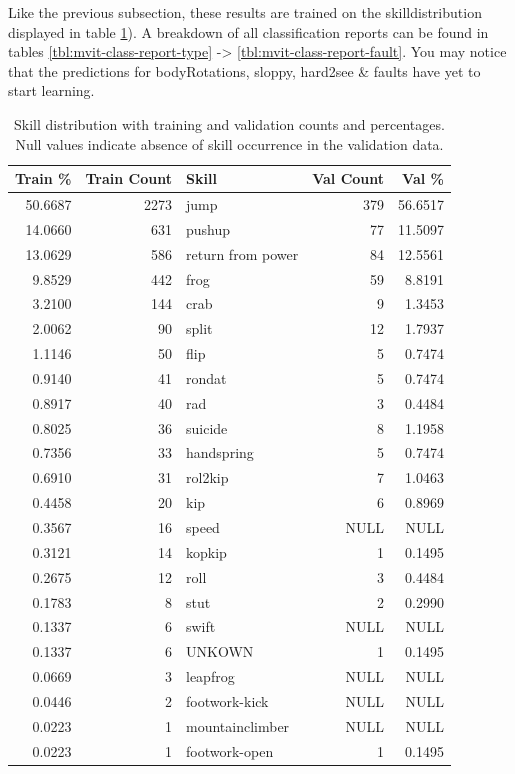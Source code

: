 Like the previous subsection, these results are trained on the skilldistribution displayed in table \ref{tab:skill_distribution_full_with_nulls}).
A breakdown of all classification reports can be found in tables \ref{tbl:mvit-class-report-type} -> \ref{tbl:mvit-class-report-fault}. You may notice that the predictions for bodyRotations, sloppy, hard2see \& faults have yet to start learning.

\begin{table}[h!]
    \centering
    \begin{tabular}{|r|r|l|r|r|}
        \hline
        \textbf{Train \%} & \textbf{Train Count} & \textbf{Skill} & \textbf{Val Count} & \textbf{Val \%} \\
        \hline
        50.6687 & 2273 & jump & 379 & 56.6517 \\
        14.0660 & 631 & pushup & 77 & 11.5097 \\
        13.0629 & 586 & return from power & 84 & 12.5561 \\
        9.8529 & 442 & frog & 59 & 8.8191 \\
        3.2100 & 144 & crab & 9 & 1.3453 \\
        2.0062 & 90 & split & 12 & 1.7937 \\
        1.1146 & 50 & flip & 5 & 0.7474 \\
        0.9140 & 41 & rondat & 5 & 0.7474 \\
        0.8917 & 40 & rad & 3 & 0.4484 \\
        0.8025 & 36 & suicide & 8 & 1.1958 \\
        0.7356 & 33 & handspring & 5 & 0.7474 \\
        0.6910 & 31 & rol2kip & 7 & 1.0463 \\
        0.4458 & 20 & kip & 6 & 0.8969 \\
        0.3567 & 16 & speed & NULL & NULL \\
        0.3121 & 14 & kopkip & 1 & 0.1495 \\
        0.2675 & 12 & roll & 3 & 0.4484 \\
        0.1783 & 8 & stut & 2 & 0.2990 \\
        0.1337 & 6 & swift & NULL & NULL \\
        0.1337 & 6 & UNKOWN & 1 & 0.1495 \\
        0.0669 & 3 & leapfrog & NULL & NULL \\
        0.0446 & 2 & footwork-kick & NULL & NULL \\
        0.0223 & 1 & mountainclimber & NULL & NULL \\
        0.0223 & 1 & footwork-open & 1 & 0.1495 \\
        \hline
    \end{tabular}
    \caption[Skill distribution skill]{Skill distribution with training and validation counts and percentages. Null values indicate absence of skill occurrence in the validation data.}
    \label{tab:skill_distribution_full_with_nulls}
\end{table}


